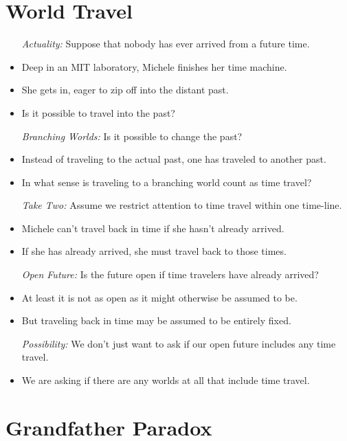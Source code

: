 \documentclass[a4paper, 11pt]{article} %
\begin{document}
\section*{World Travel}

\begin{itemize}
  \item[\it Actuality:] Suppose that nobody has ever arrived from a future time.
    \item Deep in an MIT laboratory, Michele finishes her time machine.
    \item She gets in, eager to zip off into the distant past.
    \item Is it possible to travel into the past?
  \item[\it Branching Worlds:] Is it possible to change the past?
    \item Instead of traveling to the actual past, one has traveled to another past.
    \item In what sense is traveling to a branching world count as time travel?
  \item[\it Take Two:] Assume we restrict attention to time travel within one time-line.
    \item Michele can't travel back in time if she hasn't already arrived.
    \item If she has already arrived, she must travel back to those times.
  \item[\it Open Future:] Is the future open if time travelers have already arrived?
    \item At least it is not as open as it might otherwise be assumed to be.
    \item But traveling back in time may be assumed to be entirely fixed.
  \item[\it Possibility:] We don't just want to ask if our open future includes any time travel.
    \item We are asking if there are any worlds at all that include time travel.
\end{itemize}




\section*{Grandfather Paradox}
\end{document}
